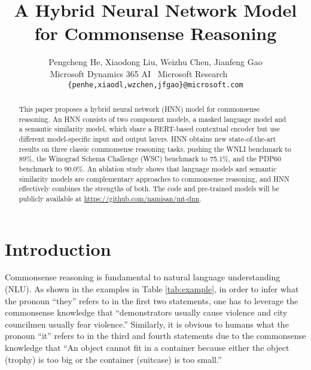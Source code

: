 \documentclass[11pt,a4paper]{article}
\title{A Hybrid Neural Network Model for Commonsense Reasoning}
\author{Pengcheng He, Xiaodong Liu, Weizhu Chen, Jianfeng Gao\\
   Microsoft Dynamics 365 AI~
   Microsoft Research~~~~~~~~\\
  {\tt \{penhe,xiaodl,wzchen,jfgao\}@microsoft.com}}
\begin{document}
\maketitle
\begin{abstract}
This paper proposes a hybrid neural network (HNN) model for commonsense reasoning. 
An HNN consists of two component models, a masked language model and a semantic similarity model, which share a BERT-based contextual encoder but use different model-specific input and output layers. 
HNN obtains new state-of-the-art results on three classic commonsense reasoning tasks, pushing the WNLI benchmark to 89\%, the Winograd Schema Challenge (WSC) benchmark to 75.1\%, and the PDP60 benchmark to 90.0\%.
An ablation study shows that language models and semantic similarity models are complementary approaches to commonsense reasoning, and HNN effectively combines the strengths of both.
The code and pre-trained models will be publicly available at \url{https://github.com/namisan/mt-dnn}.
\end{abstract}
\section{Introduction}
\label{sec:introduction}


Commonsense reasoning is fundamental to natural language understanding (NLU). As shown in the examples in Table \ref{tab:example}, in order to infer what the pronoun ``they'' refers to in the first two statements, one has to leverage the commonsense knowledge that ``demonstrators usually cause violence and city councilmen usually fear violence.'' Similarly, it is obvious to humans what the pronoun ``it'' refers to in the third and fourth statements due to the commonsense knowledge that ``An object cannot fit in a container because either the object (trophy) is too big or the container (suitcase) is too small.''
\end{document}
